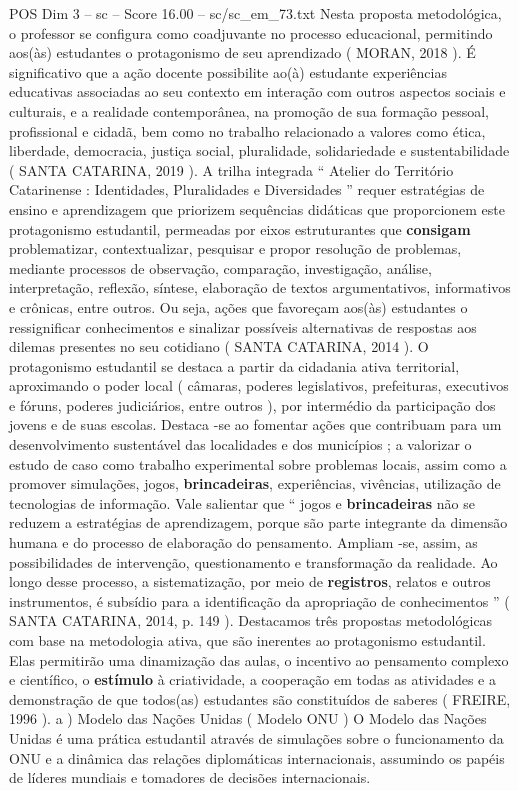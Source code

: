 \begin{textsample}{POS Dim 3 – sc – Score 16.00 – sc/sc\_em\_73.txt}
Nesta proposta metodológica, o professor se configura como coadjuvante no processo educacional, permitindo aos(às) estudantes o protagonismo de seu aprendizado ( MORAN, 2018 ).
É significativo que a ação docente possibilite ao(à) estudante experiências educativas associadas ao seu contexto em interação com outros aspectos sociais e culturais, e a realidade contemporânea, na promoção de sua formação pessoal, profissional e cidadã, bem como no trabalho relacionado a valores como ética, liberdade, democracia, justiça social, pluralidade, solidariedade e sustentabilidade ( SANTA CATARINA, 2019 ).
A trilha integrada “ Atelier do Território Catarinense : Identidades, Pluralidades e Diversidades ” requer estratégias de ensino e aprendizagem que priorizem sequências didáticas que proporcionem este protagonismo estudantil, permeadas por eixos estruturantes que \textbf{consigam} problematizar, contextualizar, pesquisar e propor resolução de problemas, mediante processos de observação, comparação, investigação, análise, interpretação, reflexão, síntese, elaboração de textos argumentativos, informativos e crônicas, entre outros.
Ou seja, ações que favoreçam aos(às) estudantes o ressignificar conhecimentos e sinalizar possíveis alternativas de respostas aos dilemas presentes no seu cotidiano ( SANTA CATARINA, 2014 ).
O protagonismo estudantil se destaca a partir da cidadania ativa territorial, aproximando o poder local ( câmaras, poderes legislativos, prefeituras, executivos e fóruns, poderes judiciários, entre outros ), por intermédio da participação dos jovens e de suas escolas.
Destaca -se ao fomentar ações que contribuam para um desenvolvimento sustentável das localidades e dos municípios ; a valorizar o estudo de caso como trabalho experimental sobre problemas locais, assim como a promover simulações, jogos, \textbf{brincadeiras}, experiências, vivências, utilização de tecnologias de informação.
Vale salientar que “ jogos e \textbf{brincadeiras} não se reduzem a estratégias de aprendizagem, porque são parte integrante da dimensão humana e do processo de elaboração do pensamento.
Ampliam -se, assim, as possibilidades de intervenção, questionamento e transformação da realidade.
Ao longo desse processo, a sistematização, por meio de \textbf{registros}, relatos e outros instrumentos, é subsídio para a identificação da apropriação de conhecimentos ” ( SANTA CATARINA, 2014, p. 149 ).
Destacamos três propostas metodológicas com base na metodologia ativa, que são inerentes ao protagonismo estudantil.
Elas permitirão uma dinamização das aulas, o incentivo ao pensamento complexo e científico, o \textbf{estímulo} à criatividade, a cooperação em todas as atividades e a demonstração de que todos(as) estudantes são constituídos de saberes ( FREIRE, 1996 ). a ) Modelo das Nações Unidas ( Modelo ONU ) O Modelo das Nações Unidas é uma prática estudantil através de simulações sobre o funcionamento da ONU e a dinâmica das relações diplomáticas internacionais, assumindo os papéis de líderes mundiais e tomadores de decisões internacionais.

\end{textsample}
